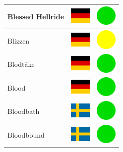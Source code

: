 \documentclass[12pt, a4paper, twoside]{report}
\begin{document}
\begin{center}
\begin{longtable}{|p{5cm}|p{2cm}|p{2cm}|}
Blessed Hellride & \includegraphics[width=1cm]{4x3/de} & \includegraphics[width=1cm]{likes/y} \\ \hline
Blizzen & \includegraphics[width=1cm]{4x3/de} & \includegraphics[width=1cm]{likes/m} \\ \hline
Blodtåke & \includegraphics[width=1cm]{4x3/de} & \includegraphics[width=1cm]{likes/y} \\ \hline
Blood & \includegraphics[width=1cm]{4x3/de} & \includegraphics[width=1cm]{likes/y} \\ \hline
Bloodbath & \includegraphics[width=1cm]{4x3/se} & \includegraphics[width=1cm]{likes/y} \\ \hline
Bloodbound & \includegraphics[width=1cm]{4x3/se} & \includegraphics[width=1cm]{likes/y} \\ \hline

\end{longtable}
\end{center}
\end{document}

